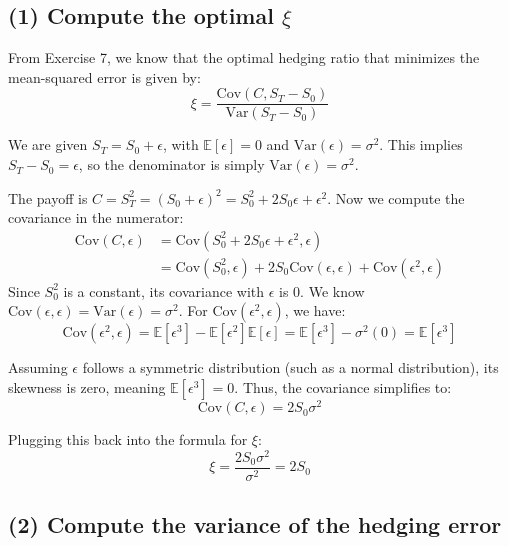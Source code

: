 \subsection*{(1) Compute the optimal $\xi$}

From Exercise 7, we know that the optimal hedging ratio that minimizes the mean-squared error is given by:
\begin{equation*}
\xi = \frac{\text{Cov}(C, S_T - S_0)}{\text{Var}(S_T - S_0)}
\end{equation*}

We are given $S_T = S_0 + \epsilon$, with $\mathbb{E}[\epsilon] = 0$ and $\text{Var}(\epsilon) = \sigma^2$. 
This implies $S_T - S_0 = \epsilon$, so the denominator is simply $\text{Var}(\epsilon) = \sigma^2$.

The payoff is $C = S_T^2 = (S_0 + \epsilon)^2 = S_0^2 + 2S_0\epsilon + \epsilon^2$.
Now we compute the covariance in the numerator:
\begin{align*}
\text{Cov}(C, \epsilon) &= \text{Cov}(S_0^2 + 2S_0\epsilon + \epsilon^2, \epsilon) \\
&= \text{Cov}(S_0^2, \epsilon) + 2S_0\text{Cov}(\epsilon, \epsilon) + \text{Cov}(\epsilon^2, \epsilon)
\end{align*}
Since $S_0^2$ is a constant, its covariance with $\epsilon$ is 0. 
We know $\text{Cov}(\epsilon, \epsilon) = \text{Var}(\epsilon) = \sigma^2$.
For $\text{Cov}(\epsilon^2, \epsilon)$, we have:
\begin{equation*}
\text{Cov}(\epsilon^2, \epsilon) = \mathbb{E}[\epsilon^3] - \mathbb{E}[\epsilon^2]\mathbb{E}[\epsilon] = \mathbb{E}[\epsilon^3] - \sigma^2(0) = \mathbb{E}[\epsilon^3]
\end{equation*}

Assuming $\epsilon$ follows a symmetric distribution (such as a normal distribution), its skewness is zero, meaning $\mathbb{E}[\epsilon^3] = 0$. 
Thus, the covariance simplifies to:
\begin{equation*}
\text{Cov}(C, \epsilon) = 2S_0\sigma^2
\end{equation*}

Plugging this back into the formula for $\xi$:
\begin{equation*}
\xi = \frac{2S_0\sigma^2}{\sigma^2} = 2S_0
\end{equation*}


\subsection*{(2) Compute the variance of the hedging error}

